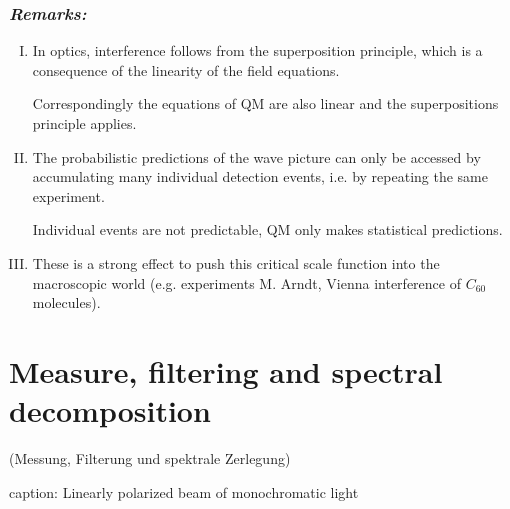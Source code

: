 \subsubsection*{\emph{Remarks:}}

\begin{enumerate}[I)]
	\item In optics, interference follows from the superposition principle, which is a consequence of the linearity of the field equations.\par
	Correspondingly the equations of QM are also linear and the superpositions principle applies.
	\item The probabilistic predictions of the wave picture can only be accessed by accumulating many individual detection events, i.e. by repeating the same experiment.\par
	Individual events are not predictable, QM only makes statistical predictions.
	\item These is a strong effect to push this critical scale function into the macroscopic world (e.g. experiments M. Arndt, Vienna interference of $ C_{60} $ molecules).
\end{enumerate}

\section{Measure, filtering and spectral decomposition}

(Messung, Filterung und spektrale Zerlegung)

\noindent
\hft
caption: Linearly polarized beam of monochromatic light\\[10pt]

